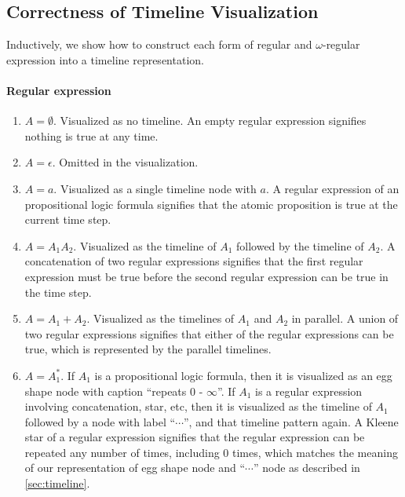 \documentclass[conference]{IEEEtran}
\theoremstyle{definition}
\theoremstyle{remark}
\begin{document}
\subsection{Correctness of Timeline Visualization}\label{sec:correctness-timeline}
Inductively, we show how to construct each form of regular and $\omega$-regular expression into a timeline representation.
\paragraph{Regular expression}
\begin{enumerate}
  \item $A = \emptyset$. Visualized as no timeline. An empty regular expression signifies nothing is true at any time.
  \item $A = \epsilon$. Omitted in the visualization.
  \item $A = a$. Visualized as a single timeline node with $a$. A regular expression of an propositional logic formula signifies that the atomic proposition is true at the current time step.
  \item $A = A_1A_2$. Visualized as the timeline of $A_1$ followed by the timeline of $A_2$. A concatenation of two regular expressions signifies that the first regular expression must be true before the second regular expression can be true in the time step.
  \item $A = A_1 + A_2$. Visualized as the timelines of $A_1$ and $A_2$ in parallel. A union of two regular expressions signifies that either of the regular expressions can be true, which is represented by the parallel timelines.
  \item $A = A_1^*$. If $A_1$ is a propositional logic formula, then it is visualized as an egg shape node with caption ``repeats 0 - $\infty$''. If $A_1$ is a regular expression involving concatenation, star, etc, then it is visualized as the timeline of $A_1$ followed by a node with label ``$\cdots$'', and that timeline pattern again. A Kleene star of a regular expression signifies that the regular expression can be repeated any number of times, including 0 times, which matches the meaning of our representation of egg shape node and ``$\cdots$''  node as described in \cref{sec:timeline}.
\end{enumerate}
\end{document}

